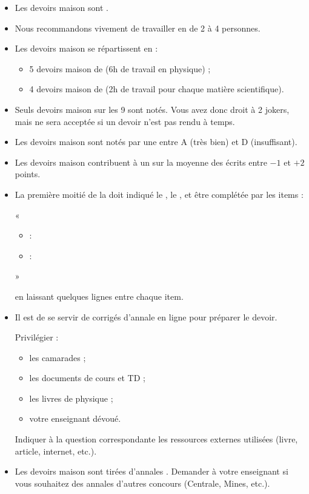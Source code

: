 \documentclass[12pt,fancy]{cours}
\begin{document}
\begin{itemize}
      \item Les devoirs maison sont .
      \item Nous recommandons vivement de travailler en  de 2 à 4 personnes.
      \item Les devoirs maison se répartissent en :
      \begin{itemize}
            \item 5 devoirs maison de  (6h de travail en physique) ;
            \item 4 devoirs maison de  (2h de travail pour chaque matière scientifique).
      \end{itemize}
      \item Seuls  devoirs maison sur les 9 sont notés. Vous avez donc droit à 2 jokers, mais  ne sera acceptée si un devoir n'est pas rendu à temps.
      \item Les devoirs maison sont notés par une  entre A (très bien) et D (insuffisant).
      \item Les devoirs maison contribuent à un  sur la moyenne des écrits entre $-1$ et $+2$ points.
      \item La première moitié de la  doit indiqué le , le , et être complétée par les items :
      
      «\begin{itemize}
            \item {} :
            \item {} :
      \end{itemize}»

      en laissant quelques lignes entre chaque item.
      \item Il est  de se servir de corrigés d'annale en ligne pour préparer le devoir. 
      
      Privilégier :
      \begin{itemize}
            \item les camarades ;
            \item les documents de cours et TD ;
            \item les livres de physique ;
            \item votre enseignant dévoué.
      \end{itemize}
      Indiquer à la question correspondante les ressources externes utilisées (livre, article, internet, etc.).
      \item Les devoirs maison sont tirées d'annales . Demander à votre enseignant si vous souhaitez des annales d'autres concours (Centrale, Mines, etc.).
\end{itemize}
\end{document}

